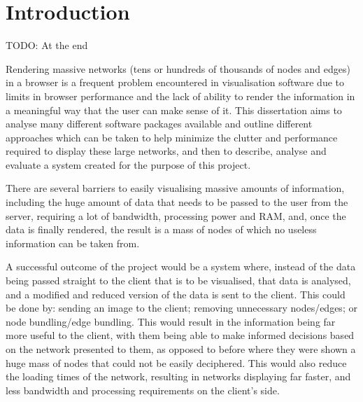 \documentclass[../dissertation.tex]{subfiles}
\begin{document}
\chapter{Introduction}

TODO: At the end

Rendering massive networks (tens or hundreds of thousands of nodes and edges) in a browser is a frequent problem encountered in visualisation software due to limits in browser performance and the lack of ability to render the information in a meaningful way that the user can make sense of it. This dissertation aims to analyse many different software packages available and outline different approaches which can be taken to help minimize the clutter and performance required to display these large networks, and then to describe, analyse and evaluate a system created for the purpose of this project.

There are several barriers to easily visualising massive amounts of information, including the huge amount of data that needs to be passed to the user from the server, requiring a lot of bandwidth, processing power and RAM, and, once the data is finally rendered, the result is a mass of nodes of which no useless information can be taken from. 

A successful outcome of the project would be a system where, instead of the data being passed straight to the client that is to be visualised, that data is analysed, and a modified and reduced version of the data is sent to the client. This could be done by: sending an image to the client; removing unnecessary nodes/edges; or node bundling/edge bundling. This would result in the information being far more useful to the client, with them being able to make informed decisions based on the network presented to them, as opposed to before where they were shown a huge mass of nodes that could not be easily deciphered. This would also reduce the loading times of the network, resulting in networks displaying far faster, and less bandwidth and processing requirements on the client's side.
\end{document}

